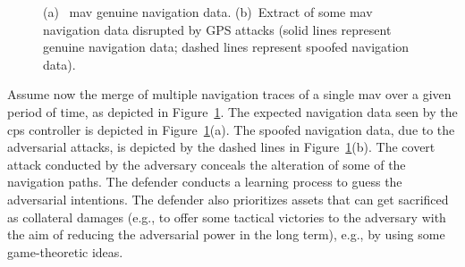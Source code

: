 \documentclass[letterpaper, 10pt, conference]{IEEEtran}
\begin{document}
\begin{figure}[!t]
\centering
{}
\caption{(a)~ \gls*{mav} genuine navigation data. (b)~Extract of some \gls*{mav}
  navigation data disrupted by GPS attacks (solid lines
  represent genuine navigation data; dashed lines represent spoofed navigation data).\label{fig:fig2}}
\end{figure}
Assume now the merge of multiple navigation traces of a single \gls*{mav} over a given period of time, as depicted in
Figure~\ref{fig:fig2}. The expected navigation data seen by the \gls*{cps}
controller is depicted in Figure~\ref{fig:fig2}(a). The spoofed
navigation data, due to the adversarial attacks, is depicted  by the
dashed lines in Figure~\ref{fig:fig2}(b). The covert attack conducted
by the adversary conceals the alteration of some of the navigation
paths. The defender conducts a learning process to guess the adversarial
intentions. The defender also prioritizes assets that can get
sacrificed as collateral damages (e.g., to offer some tactical
victories to the adversary with the aim of reducing the adversarial
power in the long term), e.g., by using some game-theoretic ideas.
\end{document}
